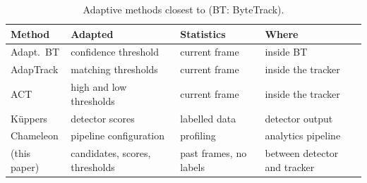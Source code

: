 \begin{table}[t]
\caption{Adaptive methods closest to \scl{} (BT: ByteTrack).}
\label{tab:related}
\centering\footnotesize
\setlength{\tabcolsep}{3pt}
\begin{tabular}{@{}>{\raggedright\arraybackslash}p{17mm}>{\raggedright\arraybackslash}p{18mm}>{\raggedright\arraybackslash}p{15mm}>{\raggedright\arraybackslash}p{18mm}@{}}
\toprule
Method & Adapted & Statistics & Where\\
\midrule
Adapt.\ BT \cite{ma2023adaptivebytetrack} & confidence threshold & current frame & inside BT\\
AdapTrack \cite{shim2024adaptrack} & matching thresholds & current frame & inside the tracker\\
ACT \cite{act2026adaptive} & high and low thresholds & current frame & inside the tracker\\
K{\"u}ppers \cite{kuppers2020detcalib} & detector scores & labelled data & detector output\\
Chameleon \cite{jiang2018chameleon} & pipeline configuration & profiling & analytics pipeline\\
\scl{} (this paper) & candidates, scores, thresholds & past frames, no labels & between detector and tracker\\
\bottomrule
\end{tabular}
\end{table}
